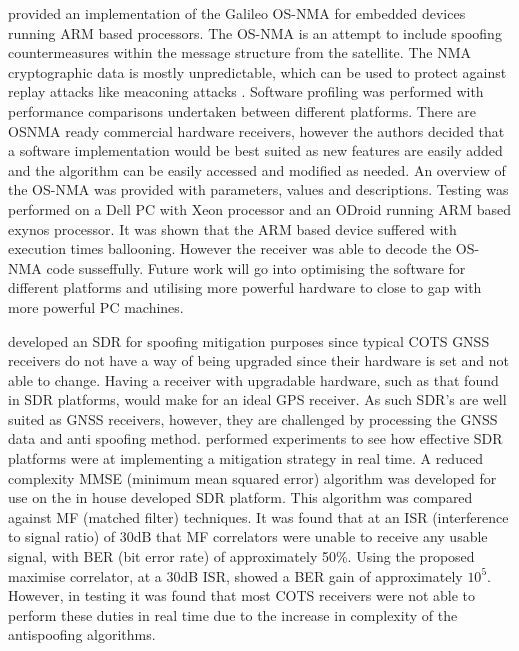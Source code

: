 \textcite{RN36} provided an implementation of the Galileo OS-NMA for embedded devices running ARM based processors. The OS-NMA is an
attempt to include spoofing countermeasures within the message structure from the satellite. The
NMA cryptographic data is mostly unpredictable, which can be used to protect against replay attacks like meaconing attacks \cite{RN37}.
Software profiling was performed with performance comparisons undertaken
between different platforms. There are OSNMA ready commercial hardware receivers, however the authors decided that a software implementation would be best suited as new
features are easily added and the algorithm can be easily accessed and modified as needed. An overview of the OS-NMA was provided with parameters, values and
descriptions. Testing was performed on a Dell PC with Xeon processor and an ODroid running ARM based exynos processor. It was shown that the ARM based device suffered
with execution times ballooning. However the receiver was able to decode the OS-NMA code susseffully. Future work will go into optimising the software for different
platforms and utilising more powerful hardware to close to gap with more powerful PC machines.

\textcite{RN18} developed an SDR for spoofing mitigation purposes since typical COTS GNSS receivers do not have a way of being upgraded since their hardware is set and
not able to change. Having a receiver with upgradable hardware, such as that found in SDR platforms, would make for an ideal GPS receiver. As such SDR's are well suited
as GNSS receivers, however, they are challenged by processing the GNSS data and anti spoofing method. \citeauthor{RN18} performed experiments to see how effective SDR
platforms were at implementing a mitigation strategy in real time. A reduced complexity MMSE (minimum mean squared error) algorithm was developed for use on the in house
developed SDR platform. This algorithm was compared against MF (matched filter) techniques. It was found that at an ISR (interference to signal ratio) of 30dB that MF
correlators were unable to receive any usable signal, with BER (bit error rate) of approximately 50\%. Using the proposed maximise correlator, at a 30dB ISR, showed a BER
gain of approximately $10^5$. However, in testing it was found that most COTS receivers were not able to perform these duties in real time due to the increase in
complexity of the antispoofing algorithms.


